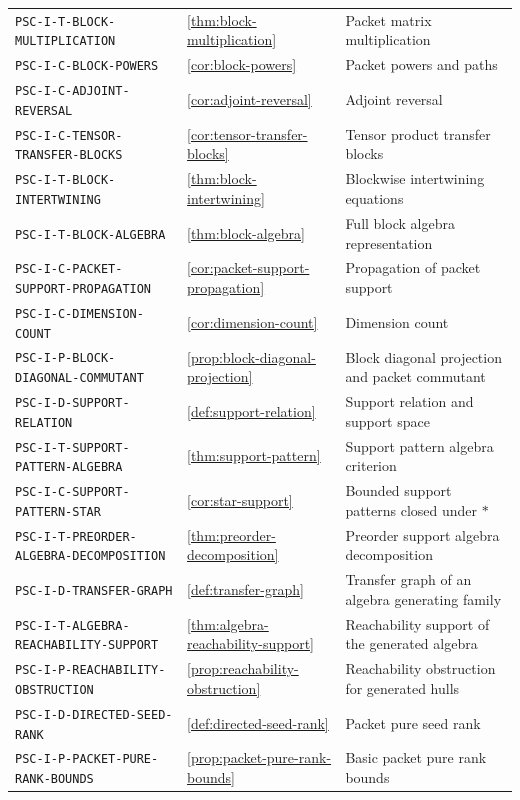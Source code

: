 \begin{longtable}{@{}p{}p{}p{}@{}}
\nolinkurl{PSC-I-T-BLOCK-MULTIPLICATION} & \ref{thm:block-multiplication} & Packet matrix multiplication \\
\nolinkurl{PSC-I-C-BLOCK-POWERS} & \ref{cor:block-powers} & Packet powers and paths \\
\nolinkurl{PSC-I-C-ADJOINT-REVERSAL} & \ref{cor:adjoint-reversal} & Adjoint reversal \\
\nolinkurl{PSC-I-C-TENSOR-TRANSFER-BLOCKS} & \ref{cor:tensor-transfer-blocks} & Tensor product transfer blocks \\
\nolinkurl{PSC-I-T-BLOCK-INTERTWINING} & \ref{thm:block-intertwining} & Blockwise intertwining equations \\
\nolinkurl{PSC-I-T-BLOCK-ALGEBRA} & \ref{thm:block-algebra} & Full block algebra representation \\
\nolinkurl{PSC-I-C-PACKET-SUPPORT-PROPAGATION} & \ref{cor:packet-support-propagation} & Propagation of packet support \\
\nolinkurl{PSC-I-C-DIMENSION-COUNT} & \ref{cor:dimension-count} & Dimension count \\
\nolinkurl{PSC-I-P-BLOCK-DIAGONAL-COMMUTANT} & \ref{prop:block-diagonal-projection} & Block diagonal projection and packet commutant \\
\nolinkurl{PSC-I-D-SUPPORT-RELATION} & \ref{def:support-relation} & Support relation and support space \\
\nolinkurl{PSC-I-T-SUPPORT-PATTERN-ALGEBRA} & \ref{thm:support-pattern} & Support pattern algebra criterion \\
\nolinkurl{PSC-I-C-SUPPORT-PATTERN-STAR} & \ref{cor:star-support} & Bounded support patterns closed under $*$ \\
\nolinkurl{PSC-I-T-PREORDER-ALGEBRA-DECOMPOSITION} & \ref{thm:preorder-decomposition} & Preorder support algebra decomposition \\
\nolinkurl{PSC-I-D-TRANSFER-GRAPH} & \ref{def:transfer-graph} & Transfer graph of an algebra generating family \\
\nolinkurl{PSC-I-T-ALGEBRA-REACHABILITY-SUPPORT} & \ref{thm:algebra-reachability-support} & Reachability support of the generated algebra \\
\nolinkurl{PSC-I-P-REACHABILITY-OBSTRUCTION} & \ref{prop:reachability-obstruction} & Reachability obstruction for generated hulls \\
\nolinkurl{PSC-I-D-DIRECTED-SEED-RANK} & \ref{def:directed-seed-rank} & Packet pure seed rank \\
\nolinkurl{PSC-I-P-PACKET-PURE-RANK-BOUNDS} & \ref{prop:packet-pure-rank-bounds} & Basic packet pure rank bounds \\

\end{longtable}
